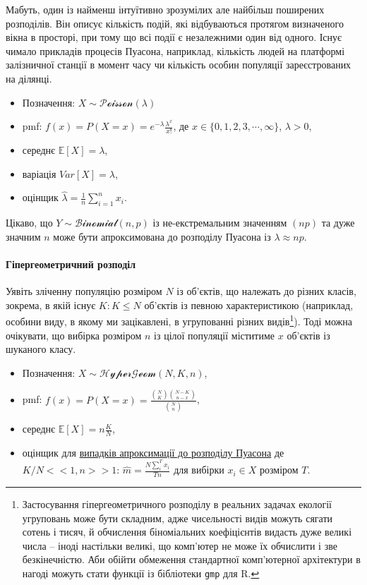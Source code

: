 \documentclass[
  11pt,
]{book}
\begin{document}
Мабуть, один із найменш інтуїтивно зрозумілих але найбільш поширених розподілів. Він описує кількість подій, які відбуваються протягом визначеного вікна в просторі, при тому що всі події є незалежними один від одного. Існує чимало прикладів процесів Пуасона, наприклад, кількість людей на платформі залізничної станції в момент часу чи кількість особин популяції зареєстрованих на ділянці.

\begin{itemize}
\item
  Позначення: \(X \sim \mathcal{Poisson}(\lambda)\)
\item
  pmf: \(f(x) = P(X = x) = e^{-\lambda} \frac{\lambda^x}{x!}\), де \(x \in \{0, 1, 2, 3, \cdots, \infty \}\), \(\lambda > 0\),
\item
  середнє \(\mathbb{E} [X] = \lambda\),
\item
  варіація \(Var[X] = \lambda\),
\item
  оцінщик \(\hat{\lambda} = \frac{1}{n} \sum \limits_{i=1}^{n}x_i\).
\end{itemize}

Цікаво, що \(Y \sim \mathcal{Binomial}(n, p)\) із не-екстремальним значенням \((np)\) та дуже значним \(n\) може бути апроксимована до розподілу Пуасона із \(\lambda \approx np\).

\paragraph{Гіпергеометричний розподіл}\label{ux433ux456ux43fux435ux440ux433ux435ux43eux43cux435ux442ux440ux438ux447ux43dux438ux439-ux440ux43eux437ux43fux43eux434ux456ux43b}

Уявіть зліченну популяцію розміром \(N\) із об'єктів, що належать до різних класів, зокрема, в якій існує \(K: K \leq N\) об'єктів із певною характеристикою (наприклад, особини виду, в якому ми зацікавлені, в угрупованні різних видів\footnote{Застосування гіпергеометричного розподілу в реальних задачах екології угруповань може бути складним, адже чисельності видів можуть сягати сотень і тисяч, й обчислення біноміальних коефіцієнтів видасть дуже великі числа -- іноді настільки великі, що комп'ютер не може їх обчислити і зве безкінечністю. Аби обійти обмеження стандартної комп'ютерної архітектури в нагоді можуть стати функції із бібліотеки \texttt{gmp} для R.}). Тоді можна очікувати, що вибірка розміром \(n\) із цілої популяції міститиме \(x\) об'єктів із шуканого класу.

\begin{itemize}
\item
  Позначення: \(X \sim \mathcal{HyperGeom}(N, K, n)\),
\item
  pmf: \(f(x) = P(X = x) = \frac{\binom{N}{K} \binom{N-K}{n - x}}{\binom{N}{n}}\),
\item
  середнє \(\mathbb{E} [X] = n \frac{K}{N}\),
\item
  оцінщик для \href{https://math.stackexchange.com/questions/40319/maximum-likelihood-estimate-of-hypergeometric-distribution-parameter}{випадків апроксимації до розподілу Пуасона} де \(K/N << 1, n >> 1\): \(\hat{m} = \frac{N \sum \limits_i^T x_i}{Tn}\) для вибірки \(x_i \in X\) розміром \(T\).
\end{itemize}
\end{document}
